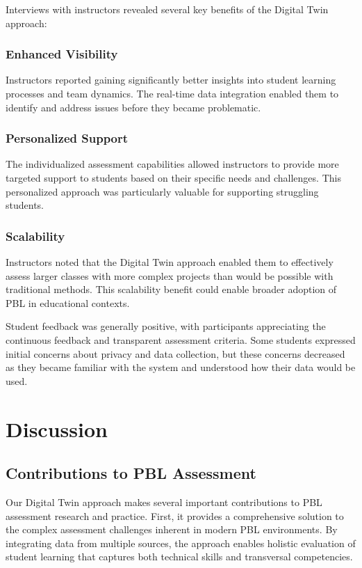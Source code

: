 \documentclass[review]{elsarticle}
\begin{document}
Interviews with instructors revealed several key benefits of the Digital Twin approach:

\subsubsection{Enhanced Visibility}
Instructors reported gaining significantly better insights into student learning processes and team dynamics. The real-time data integration enabled them to identify and address issues before they became problematic.

\subsubsection{Personalized Support}
The individualized assessment capabilities allowed instructors to provide more targeted support to students based on their specific needs and challenges. This personalized approach was particularly valuable for supporting struggling students.

\subsubsection{Scalability}
Instructors noted that the Digital Twin approach enabled them to effectively assess larger classes with more complex projects than would be possible with traditional methods. This scalability benefit could enable broader adoption of PBL in educational contexts.

Student feedback was generally positive, with participants appreciating the continuous feedback and transparent assessment criteria. Some students expressed initial concerns about privacy and data collection, but these concerns decreased as they became familiar with the system and understood how their data would be used.

\section{Discussion}
\label{sec:discussion}

\subsection{Contributions to PBL Assessment}
\label{sec:contributions}

Our Digital Twin approach makes several important contributions to PBL assessment research and practice. First, it provides a comprehensive solution to the complex assessment challenges inherent in modern PBL environments. By integrating data from multiple sources, the approach enables holistic evaluation of student learning that captures both technical skills and transversal competencies.
\end{document}
